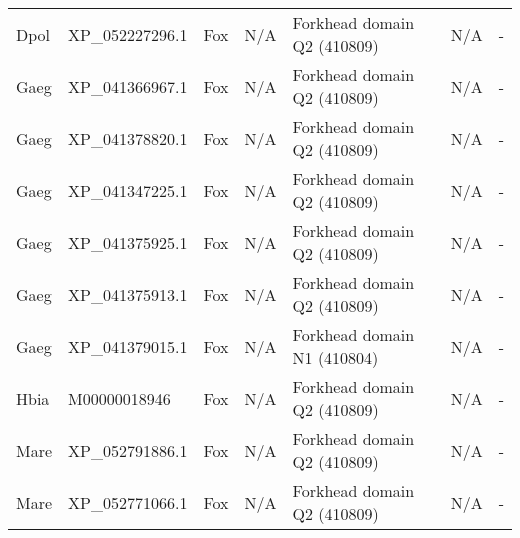 \documentclass[../main.tex]{subfiles}
\begin{document}
\begin{landscape}
\begin{longtable}{lllllll}
		Dpol           & XP\_052227296.1       & Fox            & N/A                 & Forkhead domain Q2 (410809)                 & N/A                                                                    & -                    \\
		Gaeg           & XP\_041366967.1       & Fox            & N/A                 & Forkhead domain Q2 (410809)                 & N/A                                                                    & -                    \\
		Gaeg           & XP\_041378820.1       & Fox            & N/A                 & Forkhead domain Q2 (410809)                 & N/A                                                                    & -                    \\
		Gaeg           & XP\_041347225.1       & Fox            & N/A                 & Forkhead domain Q2 (410809)                 & N/A                                                                    & -                    \\
		Gaeg           & XP\_041375925.1       & Fox            & N/A                 & Forkhead domain Q2 (410809)                 & N/A                                                                    & -                    \\
		Gaeg           & XP\_041375913.1       & Fox            & N/A                 & Forkhead domain Q2 (410809)                 & N/A                                                                    & -                    \\
		Gaeg           & XP\_041379015.1       & Fox            & N/A                 & Forkhead domain N1 (410804)                 & N/A                                                                    & -                    \\
		Hbia           & M00000018946          & Fox            & N/A                 & Forkhead domain Q2 (410809)                 & N/A                                                                    & -                    \\
		Mare           & XP\_052791886.1       & Fox            & N/A                 & Forkhead domain Q2 (410809)                 & N/A                                                                    & -                    \\
		Mare           & XP\_052771066.1       & Fox            & N/A                 & Forkhead domain Q2 (410809)                 & N/A                                                                    & -                    \\

\end{longtable}
\end{landscape}
\end{document}
